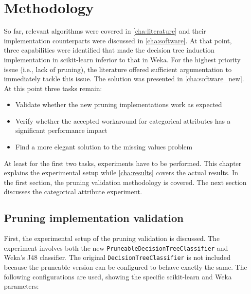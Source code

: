 \chapter{Methodology}\label{cha:method}
So far, relevant algorithms were covered in \autoref{cha:literature} and their implementation counterparts were discussed in \autoref{cha:software}. At that point, three capabilities were identified that made the decision tree induction implementation in scikit-learn inferior to that in Weka. For the highest priority issue (i.e., lack of pruning), the literature offered sufficient argumentation to immediately tackle this issue. The solution was presented in \autoref{cha:software_new}. At this point three tasks remain:
\begin{itemize}
    \item Validate whether the new pruning implementations work as expected
    \item Verify whether the accepted workaround for categorical attributes has a significant performance impact
    \item Find a more elegant solution to the missing values problem
\end{itemize}

At least for the first two tasks, experiments have to be performed. This chapter explains the experimental setup while \autoref{cha:results} covers the actual results. In the first section, the pruning validation methodology is covered. The next section discusses the categorical attribute experiment.

\section{Pruning implementation validation}
First, the experimental setup of the pruning validation is discussed. The experiment involves both the new \texttt{PruneableDecisionTreeClassifier} and Weka's J48 classifier. The original \texttt{DecisionTreeClassifier} is not included because the pruneable version can be configured to behave exactly the same. The following configurations are used, showing the specific scikit-learn and Weka parameters:


